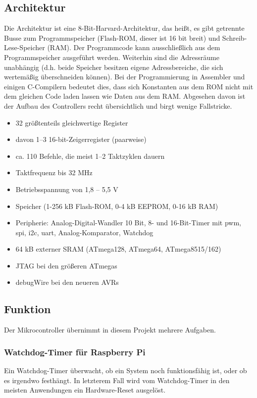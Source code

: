 \subsection{Architektur}
Die Architektur ist eine 8-Bit-Harvard-Architektur, das heißt, es gibt getrennte Busse zum Programmspeicher (Flash-ROM, dieser ist 16 bit breit) und Schreib-Lese-Speicher (RAM). Der Programmcode kann ausschließlich aus dem Programmspeicher ausgeführt werden. Weiterhin sind die Adressräume unabhängig (d.h. beide Speicher besitzen eigene Adressbereiche, die sich wertemäßig überschneiden können). Bei der Programmierung in Assembler und einigen C-Compilern bedeutet dies, dass sich Konstanten aus dem ROM nicht mit dem gleichen Code laden lassen wie Daten aus dem RAM. Abgesehen davon ist der Aufbau des Controllers recht übersichtlich und birgt wenige Fallstricke.
\begin{itemize}
\item 32 größtenteils gleichwertige Register
\item davon 1–3 16-bit-Zeigerregister (paarweise)
\item ca. 110 Befehle, die meist 1–2 Taktzyklen dauern
\item Taktfrequenz bis 32 MHz
\item Betriebsspannung von 1,8 – 5,5 V
\item Speicher (1-256 kB Flash-ROM, 0-4 kB EEPROM, 0-16 kB RAM)
\item Peripherie: Analog-Digital-Wandler 10 Bit, 8- und 16-Bit-Timer mit \ac{pwm}, \ac{spi}, \ac{i2c}, \ac{uart}, Analog-Komparator, Watchdog
\item 64 kB externer SRAM (ATmega128, ATmega64, ATmega8515/162)
\item JTAG bei den größeren ATmegas
\item debugWire bei den neueren AVRs		
\end{itemize}
\cite[Architektur]{mikrocontroller-avr}

\subsection{Funktion}
Der Mikrocontroller übernimmt in diesem Projekt mehrere Aufgaben.
\subsubsection{Watchdog-Timer für Raspberry Pi}
Ein Watchdog-Timer überwacht, ob ein System noch funktionsfähig ist, oder ob es irgendwo festhängt.
In letzterem Fall wird vom Watchdog-Timer in den meisten Anwendungen ein Hardware-Reset ausgelöst.\par


